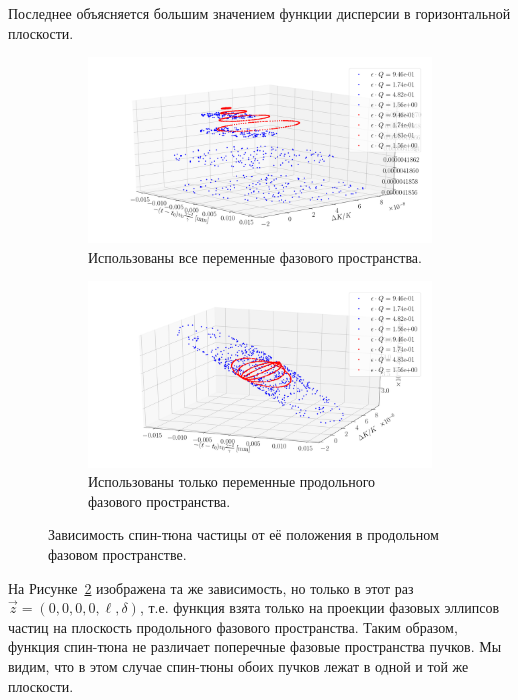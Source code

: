 \documentclass{article}
\begin{document}
Последнее объясняется большим значением функции дисперсии в горизонтальной плоскости.

\begin{figure}[h]
  \centering
  \begin{subfigure}{\linewidth}\centering
    \includegraphics[height=.3\paperheight]{../../img/STUNE_TRAJ_TEST/3D_plot_all_ps_vars}
    \caption{Использованы все переменные фазового пространства.\label{fig:main:all_ps}}
  \end{subfigure}
  \begin{subfigure}{\linewidth}\centering
    \includegraphics[height=.3\paperheight]{../../img/STUNE_TRAJ_TEST/3D_plot_only_long_ps_vars}
    \caption{Использованы только переменные продольного фазового пространства.\label{fig:main:long_ps}}
  \end{subfigure}
  \caption{Зависимость спин-тюна частицы от её положения в продольном фазовом пространстве.\label{fig:main}}
\end{figure}

На Рисунке~\ref{fig:main:long_ps} изображена та же зависимость, но только в этот раз
$\vec z = (0, 0, 0, 0, \ell, \delta)$, т.е. функция взята только на проекции фазовых эллипсов частиц на плоскость
продольного фазового пространства. Таким образом, функция спин-тюна не различает поперечные фазовые пространства
пучков. Мы видим, что в этом случае спин-тюны обоих пучков лежат в одной и той же плоскости.
\end{document}
